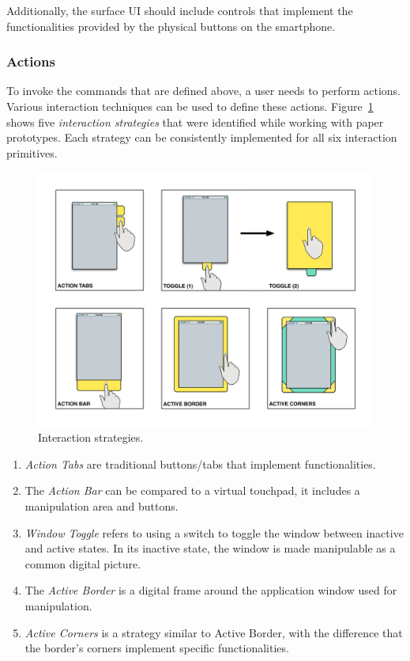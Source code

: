 Additionally, the surface UI should include controls that implement the functionalities provided by the physical buttons on the smartphone.

\subsubsection{Actions}

To invoke the commands that are defined above, a user needs to perform actions.
Various interaction techniques can be used to define these actions.
Figure~\ref{strategies} shows five \emph{interaction strategies} that were identified while working with paper prototypes.
Each strategy can be consistently implemented for all six interaction primitives.

\begin{figure}[htb]
\centering
\includegraphics[width=1\linewidth]{images/strategies}
\caption{Interaction strategies.}
\label{strategies}
\end{figure}

\begin{enumerate}
\item{\emph{Action Tabs} are traditional buttons/tabs that implement functionalities.}
\item{The \emph{Action Bar} can be compared to a virtual touchpad, it includes a manipulation area and buttons.}
\item{\emph{Window Toggle} refers to using a switch to toggle the window between inactive and active states. In its inactive state, the window is made manipulable as a common digital picture.}
\item{The \emph{Active Border} is a digital frame around the application window used for manipulation.}
\item{\emph{Active Corners} is a strategy similar to Active Border, with the difference that the border's corners implement specific functionalities.}
\end{enumerate}

